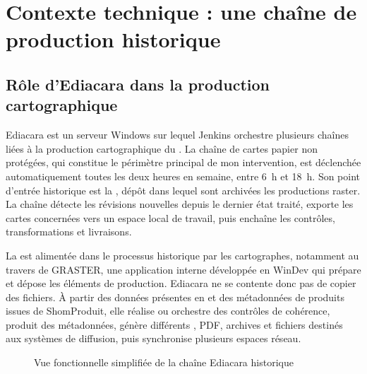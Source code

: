 \section{Contexte technique : une chaîne de production historique}

\subsection{Rôle d'Ediacara dans la production cartographique}

Ediacara est un serveur Windows sur lequel Jenkins orchestre plusieurs chaînes liées à la production cartographique du . La chaîne de cartes papier non protégées, qui constitue le périmètre principal de mon intervention, est déclenchée automatiquement toutes les deux heures en semaine, entre 6~h et 18~h. Son point d'entrée historique est la , dépôt  dans lequel sont archivées les productions raster. La chaîne détecte les révisions nouvelles depuis le dernier état traité, exporte les cartes concernées vers un espace local de travail, puis enchaîne les contrôles, transformations et livraisons.

La  est alimentée dans le processus historique par les cartographes, notamment au travers de GRASTER, une application interne développée en WinDev qui prépare et dépose les éléments de production. Ediacara ne se contente donc pas de copier des fichiers. À partir des données présentes en  et des métadonnées de produits issues de ShomProduit, elle réalise ou orchestre des contrôles de cohérence, produit des métadonnées, génère différents , PDF, archives et fichiers destinés aux systèmes de diffusion, puis synchronise plusieurs espaces réseau.

\begin{figure}[H]
\centering
{}
\caption{Vue fonctionnelle simplifiée de la chaîne Ediacara historique}
\label{fig:ediacara-historique}
\end{figure}


